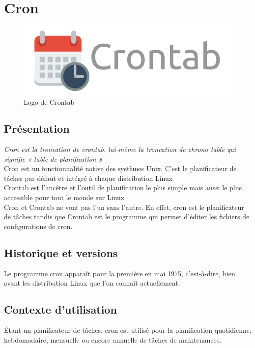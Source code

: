 \documentclass[12pt]{article}
\begin{document}
\section{Cron}

\begin{figure}[ht]
    \includegraphics[scale=0.5]{images/crontab.png}
    \caption{Logo de Crontab}
\end{figure}

\subsection{Présentation}

\textit{Cron est la troncation de crontab, lui-même la troncation de chrono table qui signifie « table de planification »}
\\
Cron est un fonctionnalité native des systèmes Unix. C'est le planificateur de tâches par défaut et intégré à chaque distribution Linux
\\
Crontab est l’ancêtre et l'outil de  planification le plus simple mais aussi le plus accessible pour tout le monde sur Linux
\\
Cron et Crontab ne vont pas l'un sans l'autre. En effet, cron est le planificateur de tâches tandis que Crontab est le programme qui permet d'éditer les fichiers de configurations de cron.

\subsection{Historique et versions}
Le programme cron apparaît pour la première en mai 1975, c'est-à-dire, bien avant les distribution Linux que l'on connaît actuellement.

\subsection{Contexte d'utilisation}
Étant un planificateur de tâches, cron est utilisé pour la planification quotidienne, hebdomadaire, mensuelle ou encore annuelle de tâches de maintenances.
\end{document}
